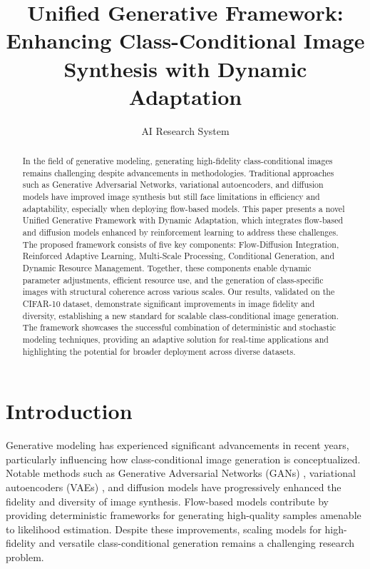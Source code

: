 \documentclass{article} %
\title{Unified Generative Framework: \\Enhancing Class-Conditional Image \\Synthesis with Dynamic Adaptation}
\author{AI Research System}
\begin{document}
\maketitle

\begin{abstract}
In the field of generative modeling, generating high-fidelity class-conditional images remains challenging despite advancements in methodologies. Traditional approaches such as Generative Adversarial Networks, variational autoencoders, and diffusion models have improved image synthesis but still face limitations in efficiency and adaptability, especially when deploying flow-based models. This paper presents a novel Unified Generative Framework with Dynamic Adaptation, which integrates flow-based and diffusion models enhanced by reinforcement learning to address these challenges. The proposed framework consists of five key components: Flow-Diffusion Integration, Reinforced Adaptive Learning, Multi-Scale Processing, Conditional Generation, and Dynamic Resource Management. Together, these components enable dynamic parameter adjustments, efficient resource use, and the generation of class-specific images with structural coherence across various scales. Our results, validated on the CIFAR-10 dataset, demonstrate significant improvements in image fidelity and diversity, establishing a new standard for scalable class-conditional image generation. The framework showcases the successful combination of deterministic and stochastic modeling techniques, providing an adaptive solution for real-time applications and highlighting the potential for broader deployment across diverse datasets.

\end{abstract}


\section{Introduction}

Generative modeling has experienced significant advancements in recent years, particularly influencing how class-conditional image generation is conceptualized. Notable methods such as Generative Adversarial Networks (GANs) \citep{goodfellow2014generative}, variational autoencoders (VAEs) \citep{kingma2013auto}, and diffusion models \citep{ho2020denoising} have progressively enhanced the fidelity and diversity of image synthesis. Flow-based models \citep{dinh2016density,kingma2018glow} contribute by providing deterministic frameworks for generating high-quality samples amenable to likelihood estimation. Despite these improvements, scaling models for high-fidelity and versatile class-conditional generation remains a challenging research problem.
\end{document}
